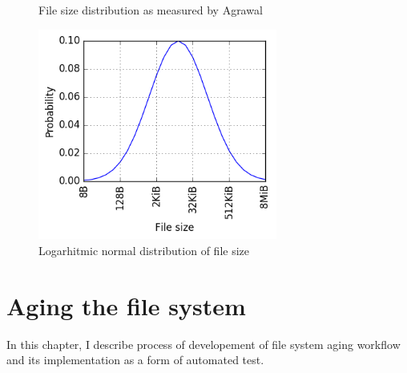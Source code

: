 \documentclass[
  color, %
  table, %
  lof,   %
  lot,   %
]{fithesis3}
\begin{document}
\begin{figure}
    \centering
    \caption{File size distribution as measured by Agrawal~\cite{agrawal2007five}}
    \label{fig:filedist}
\end{figure}

\begin{figure}%
    \begin{minipage}{\textwidth}
        \centering
        \includegraphics[width=0.7\textwidth]{../scripts/dist3.png}
        \caption{Logarhitmic normal distribution of file size}
\label{fig:lognormal}
    \end{minipage}
\end{figure}



\chapter{Aging the file system}
\label{aging}
In this chapter, I describe process of developement of file system aging workflow and its implementation as a form of automated test.
\end{document}
